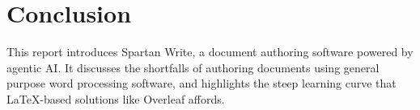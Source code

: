 \section{Conclusion}

This report introduces Spartan Write, a document authoring software powered by agentic AI.
It discusses the shortfalls of authoring documents using general purpose word processing software, and highlights the steep learning curve that \LaTeX-based solutions like Overleaf affords.
